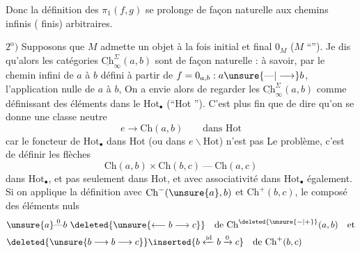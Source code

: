Donc la définition des $\pi_1(f,g)$  se prolonge de façon naturelle aux chemins infinis ( finis) arbitraires.

$2^{\mathrm o})$ Supposons que $M$ admette un objet à la fois initial et final $0_M$ ($M$ ``''). Je dis qu'alors  les catégories $\underline{\mathrm{Ch}}_{\infty}^{\Sigma}(a,b)$ sont  de façon naturelle : à savoir, par le chemin infini de $a$ à $b$ défini  à partir de $f=0_{a,b}:a\unsure{\text{---}|\longrightarrow}b$, l'application nulle de $a$ à $b$, On  a envie alors de regarder les $\underline{\mathrm{Ch}}_{\infty}^{\Sigma}(a,b)$ comme définissant des éléments dans le $\mathrm{Hot}_{\bullet}$ (``Hot ''). C'est plus fin que de dire qu'on se donne une classe neutre
\[
e\longrightarrow\mathrm{Ch}(a,b)\qquad\text{dans Hot}
\]
car le foncteur de $\mathrm{Hot}_{\bullet}$ dans $\mathrm{Hot}$ (ou dans $e\backslash\mathrm{Hot}$) n'est pas  Le problème, c'est de définir les flèches
\[
\mathrm{Ch}(a,b)\times\mathrm{Ch}(b,c)\ \text{---}\ \mathrm{Ch}(a,c)
\]
dans $\mathrm{Hot}_{\bullet}$, et pas seulement dans $\mathrm{Hot}$, et avec associativité  dans $\mathrm{Hot}_{\bullet}$ également. Si on applique la définition avec $\mathrm{Ch}^{-}(\unsure{a},b)$ et $\mathrm{Ch}^{+}(b,c)$, le composé des éléments nuls
\[
\begin{aligned}
&\unsure{a}\overset{0}{\text{---}}b\ \deleted{\unsure{\longleftarrow b\longrightarrow c}}\quad\text{de }\mathrm{Ch}^{\deleted{\unsure{-|+}}}(a,b)\quad\text{et}\\
&\deleted{\unsure{b\longrightarrow b\longrightarrow c}}\inserted{b\xleftarrow{\mathrm{id}}b\xrightarrow{0}c}\quad\text{de }\mathrm{Ch}^{+}(b,c)
\end{aligned}
\]

